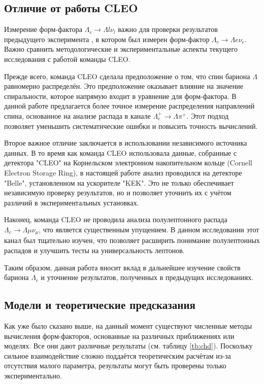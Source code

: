 \subsection{Отличие от работы CLEO}

Измерение форм-фактора $\Lambda_c \rightarrow \Lambda l \nu_l$ важно для проверки результатов предыдущего эксперимента \textbf{\cite{CLEO2023}}, в котором был измерен форм-фактор $\Lambda_c \rightarrow \Lambda e \nu_e$. Важно сравнить методологические и экспериментальные аспекты текущего исследования с работой команды CLEO.

Прежде всего, команда CLEO сделала предположение о том, что спин бариона $\Lambda$ равномерно распределён. Это предположение оказывает влияние на значение спиральности, которое напрямую входит в уравнение для форм-фактора. В данной работе предлагается более точное измерение распределения направлений спина, основанное на анализе распада в канале $\Lambda_c^+ \rightarrow \Lambda \pi^+$. Этот подход позволяет уменьшить систематические ошибки и повысить точность вычислений.

Второе важное отличие заключается в использовании независимого источника данных. В то время как команда CLEO использовала данные, собранные с детектора "CLEO" на Корнельском электронном накопительном кольце (Cornell Electron Storage Ring), в настоящей работе анализ проводился на детекторе "Belle", установленном на ускорителе "KEK". Это не только обеспечивает независимую проверку результатов, но и позволяет уточнить их с учётом различий в экспериментальных установках.

Наконец, команда CLEO не проводила анализа полулептонного распада $\Lambda_c \rightarrow \Lambda \mu \nu_\mu$, что является существенным упущением. В данном исследовании этот канал был тщательно изучен, что позволяет расширить понимание полулептонных распадов и улучшить тесты на универсальность лептонов.

Таким образом, данная работа вносит вклад в дальнейшее изучение свойств бариона $\Lambda_c$ и уточнение результатов, полученных в предыдущих исследованиях.

\subsection{Модели и теоретические предсказания}

Как уже было сказано выше, на данный момент существуют численные методы вычисления форм-факторов, основанные на различных приближениях или моделях. Все они дают различные результаты (см. таблицу \ref{tb:chd}). Поскольку сильное взаимодействие сложно поддаётся теоретическим расчётам из-за отсутствия малого параметра, результаты могут быть проверены только экспериментально.

